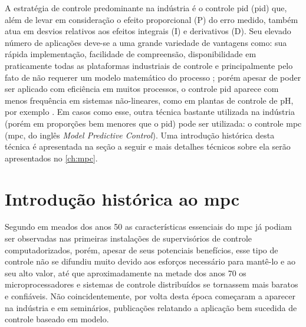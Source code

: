 A estratégia de controle predominante na indústria é o controle \acrshort{pid}
(\acrlong{pid}) \cite{Camacho2007} que, além de levar em consideração o efeito proporcional (P) do erro
medido, também atua em desvios relativos aos efeitos integrais (I) e derivativos (D).
Seu elevado número de aplicações deve-se a uma grande variedade de vantagens como:
sua rápida implementação, facilidade de compreensão, disponibilidade em praticamente
todas as plataformas industriais de controle e principalmente pelo fato de não requerer
um modelo matemático do processo \cite{Goncalves2012}; porém apesar de poder ser aplicado com eficiência em
muitos processos, o controle \acrshort{pid} aparece com menos frequência
em sistemas não-lineares, como em plantas de controle de pH, por exemplo \cite{Goncalves2012}. Em casos como
esse, outra técnica bastante utilizada na indústria (porém em proporções bem menores
que o \acrshort{pid}) pode ser utilizada: o controle \acrshort{mpc} (\acrlong{mpc},
do inglês \textit{Model Predictive Control}). Uma introdução histórica desta técnica é apresentada
na seção a seguir e mais detalhes técnicos sobre ela serão apresentados no \cref{ch:mpc}.


\section{Introdução histórica ao \acrshort{mpc}}
\label{sec:intro_mpc}

Segundo  em meados dos anos 50 as características essenciais do \acrshort{mpc}
já podiam ser observadas nas primeiras instalações de supervisórios de controle computadorizados,
porém, apesar de seus potenciais benefícios, esse tipo de controle não se difundiu muito
devido aos esforços necessário para mantê-lo e ao seu alto valor, até que aproximadamente
na metade dos anos 70 os microprocessadores e sistemas de controle distribuídos se tornassem
mais baratos e confiáveis. Não coincidentemente, por volta desta época começaram a aparecer na indústria
e em seminários, publicações relatando a aplicação bem sucedida de controle baseado em modelo. \cite{Lee2011}

